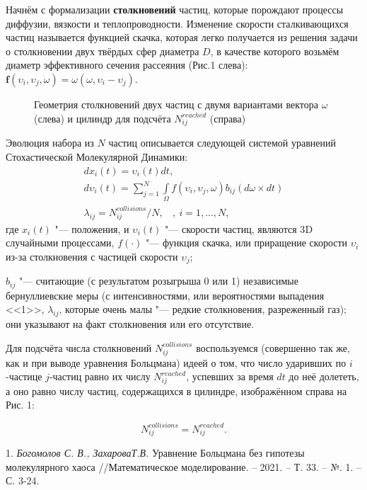 Начнём с формализации \textbf{столкновений} частиц, которые порождают процессы диффузии, вязкости и теплопроводности. Изменение скорости сталкивающихся частиц называется функцией скачка, которая легко получается из решения задачи о столкновении двух твёрдых сфер диаметра $ D $, в качестве которого возьмём диаметр эффективного сечения рассеяния (Рис.1 слева):
$\textbf{f}(\textbf{$\upsilon_{i}$},\textbf{$\upsilon_{j}$},\textbf{$\omega$}) = \textbf{$\omega$} (\textbf{$\omega$},\textbf{$\upsilon_{i}$} - \textbf{$\upsilon_{j}$})$.\\
\begin{figure}[h!]%
	\caption{Геометрия столкновений двух частиц с двумя вариантами вектора $\omega$ (слева) и цилиндр для подсчёта $N_{ij}^{reached}$ (справа)}
\end{figure}

Эволюция набора из $N$ частиц описывается следующей системой уравнений Стохастической Молекулярной Динамики:
\begin{eqnarray}\label{SMD}
	dx_{i}(t) = \upsilon_{i}(t) dt ,\ \ \ \nonumber \\
	d\upsilon_{i}(t) = \sum\limits_{j=1}^N\int \limits_\Omega f(\upsilon_{i},\upsilon_{j},\omega)b_{ij}(d\omega\times dt) %
	\\
	\lambda_{ij} =N_{ij}^{collisions}/N , \ \ \ \ , \ i=1,...,N,\nonumber
\end{eqnarray}
где $x_{i}(t)$ "--- положения, и $\upsilon_{i}(t)$ "--- скорости частиц, являются 3{D} случайными процессами,
 $f(\cdot)$ "--- функция скачка, или приращение скорости $\upsilon_{i}$ из-за столкновения с частицей скорости $\upsilon_{j}$;

 $b_{ij}$ "--- считающие (с результатом розыгрыша 0 или 1) независимые бернуллиевские меры (с интенсивностями, или вероятностями выпадения <<1>>, $\lambda_{ij}$, которые очень малы "--- редкие столкновения, разреженный газ); они указывают на факт столкновения или его отсутствие.



Для подсчёта числа столкновений $N_{ij}^{collisions}$ воспользуемся (совершенно так же, как и при выводе уравнения Больцмана)
идеей о том, что число ударивших по $ i $-частице $ j $-частиц равно их числу $N_{ij}^{reached}$, успевших за время $ dt $ до неё долететь,
а оно равно числу частиц, содержащихся в цилиндре, изображённом справа на Рис. 1: %

\begin{equation}\label{Nreached}
	N_{ij}^{collisions} = N_{ij}^{reached}.
\end{equation}


\litlist

1. {\it Богомолов С. В., ЗахароваТ.В.}
 Уравнение Больцмана без гипотезы молекулярного хаоса //Математическое моделирование. – 2021. – Т. 33. – №. 1. – С. 3-24.
